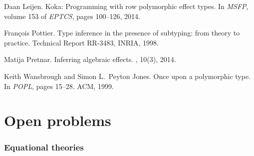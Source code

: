 \documentclass[a4paper,UKenglish]{dagrep}
\begin{document}
\begin{thebibliography}{1}

Daan Leijen.
\newblock Koka: Programming with row polymorphic effect types.
\newblock In {\em {MSFP}}, volume 153 of {\em {EPTCS}}, pages 100--126, 2014.

Fran{\c{c}}ois Pottier.
\newblock Type inference in the presence of subtyping: from theory to practice.
\newblock Technical Report RR-3483, INRIA, 1998.

Matija Pretnar.
\newblock Inferring algebraic effects.
, 10(3), 2014.

Keith Wansbrough and Simon L.~Peyton Jones.
\newblock Once upon a polymorphic type.
\newblock In {\em {POPL}}, pages 15--28. {ACM}, 1999.

\end{thebibliography}





\section{Open problems}

\license

\newcommand{\chooseop}{\mathtt{choose}}
\newcommand{\comm}{\mathtt{comm}}
\newcommand{\assoc}{\mathtt{assoc}}
\newcommand{\idem}{\mathtt{idem}}
\newcommand{\ops}{\mathcal{O}}
\newcommand{\eqs}{\mathcal{E}}
\newcommand{\intty}{\mathtt{int}}
\newcommand{\hto}{\Rightarrow}

\subsubsection*{Equational theories}
\end{document}

